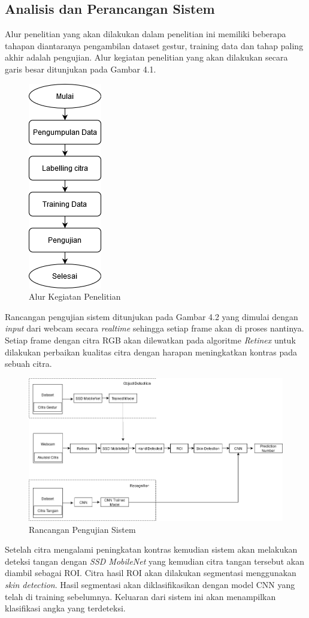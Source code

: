 \subsection{Analisis dan Perancangan Sistem}
Alur penelitian yang akan dilakukan dalam penelitian ini memiliki beberapa tahapan diantaranya pengambilan dataset gestur, training data dan tahap paling akhir adalah pengujian. Alur kegiatan penelitian yang akan dilakukan secara garis besar ditunjukan pada Gambar 4.1.
\begin{figure}[H]
	\centering
	\includegraphics[width=0.2\linewidth]{Rencana}
	\caption{Alur Kegiatan Penelitian}
	\label{fig:screenshot006}
\end{figure}
Rancangan pengujian sistem ditunjukan pada Gambar 4.2 yang dimulai dengan \emph{input} dari webcam secara \emph{realtime} sehingga setiap frame akan di proses nantinya.
Setiap frame dengan citra RGB akan dilewatkan pada algoritme \emph{Retinex} untuk dilakukan perbaikan kualitas citra dengan harapan meningkatkan kontras pada sebuah citra.
\begin{figure}[H]
	\centering
	\includegraphics[width=0.9\linewidth]{rancangan}
	\caption{Rancangan Pengujian Sistem}
	\label{fig:rancangan}
\end{figure}
\noindent Setelah citra mengalami peningkatan kontras kemudian sistem akan melakukan deteksi tangan dengan \emph{SSD MobileNet} yang kemudian citra tangan tersebut akan diambil sebagai ROI. 
Citra hasil ROI akan dilakukan segmentasi menggunakan \emph{skin detection}. Hasil segmentasi akan diklasifikasikan dengan model CNN yang telah di training sebelumnya.
Keluaran dari sistem ini akan menampilkan klasifikasi angka yang terdeteksi.
